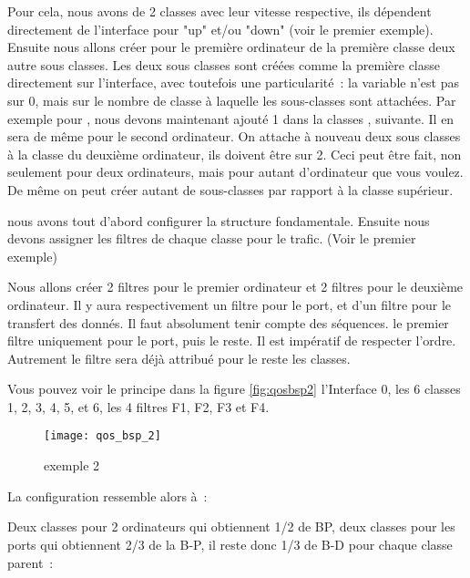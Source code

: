     Pour cela, nous avons de 2 classes avec leur vitesse respective,
    ils dépendent directement de l'interface pour "up" et/ou "down" (voir
    le premier exemple). Ensuite nous allons créer pour le première
    ordinateur de la première classe deux autre sous classes. Les deux
    sous classes sont créées comme la première classe directement sur
    l'interface, avec toutefois une particularité~: la variable
     n'est pas sur 0, mais sur le nombre
    de classe à laquelle les sous-classes sont attachées. Par exemple pour
    , nous devons maintenant ajouté 1 dans la classes
    , suivante. Il en sera de même pour le second
    ordinateur. On attache à nouveau deux sous classes à la classe
    du deuxième ordinateur, ils doivent être sur 2. Ceci peut être fait,
    non seulement pour deux ordinateurs, mais pour autant d'ordinateur que
    vous voulez. De même on peut créer autant de sous-classes par rapport
    à la classe supérieur.

    nous avons tout d'abord configurer la structure fondamentale. Ensuite
    nous devons assigner les filtres de chaque classe pour le trafic.
    (Voir le premier exemple)

    Nous allons créer 2 filtres pour le premier ordinateur et 2 filtres
    pour le deuxième ordinateur. Il y aura respectivement un filtre pour
    le port, et d'un filtre pour le transfert des donnés. Il faut
    absolument tenir compte des séquences. le premier filtre uniquement
    pour le port, puis le reste. Il est impératif de respecter l'ordre.
    Autrement le filtre sera déjà attribué pour le reste les classes.

    Vous pouvez voir le principe dans la figure \ref{fig:qosbsp2}
    l'Interface 0, les 6 classes 1, 2, 3, 4, 5, et 6, les 4 filtres F1,
    F2, F3 et F4.

    \begin{figure}[htbp]
      \centering
      \texttt{[image: qos\_bsp\_2]}%
      \caption{ exemple 2}
    \end{figure}

    La configuration ressemble alors à~:

    Deux classes pour 2 ordinateurs qui obtiennent 1/2 de BP, deux
    classes pour les ports qui obtiennent 2/3 de la B-P, il reste donc
    1/3 de B-D pour chaque classe parent~:

